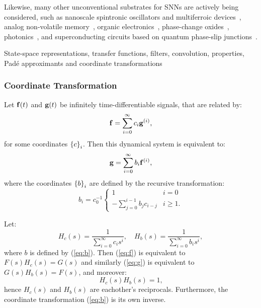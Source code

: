 Likewise, many other unconventional substrates for SNNs are actively being considered, such as nanoscale spintronic oscillators and multiferroic devices~\citep{torrejon2017neuromorphic, hoppensteadt2017applied, manipatruni2018beyond}, analog non-volatile memory~\citep{ambrogio2018equivalent}, organic electronics~\citep{van2018organic}, phase-change oxides~\citep{zhao2019low}, photonics~\citep{tait2018silicon, shainline2018largest}, and superconducting circuits based on quantum phase-slip junctions~\citep[QPSJs;][]{cheng2019superconducting}.


State-space representations, transfer functions, filters, convolution, properties, Pad\'e approximants and coordinate transformations

\subsubsection{Coordinate Transformation}

\begin{theorem}
Let $\mathbf{f}(t)$ and $\mathbf{g}(t)$ be infinitely time-differentiable signals, that are related by:
\begin{equation} \label{eq:f}
\mathbf{f} = \sum_{i=0}^\infty c_i \mathbf{g}^{(i)} \text{,}
\end{equation}
for some coordinates $\left\{ c \right\}_{i}$. Then this dynamical system is equivalent to:
\begin{equation} \label{eq:g}
\mathbf{g} = \sum_{i=0}^\infty b_i \mathbf{f}^{(i)} \text{,}
\end{equation}
where the coordinates $\left\{ b \right\}_{i}$ are defined by the recursive transformation:
\begin{equation} \label{eq:b}
b_i = c_0^{-1} \begin{cases}
    1 & i = 0 \\
    - \sum_{j=0}^{i-1} b_j c_{i - j} & i \ge 1 \text{.}
  \end{cases}
\end{equation}
\end{theorem}

\begin{corollary}
Let: $$H_c(s) = \frac{1}{\sum_{i=0}^\infty c_i s^i}, \quad H_b(s) = \frac{1}{\sum_{i=0}^\infty b_i s^i}, $$ where $b$ is defined by (\ref{eq:b}). Then (\ref{eq:f}) is equivalent to $F(s)H_c(s) = G(s)$ and similarly (\ref{eq:g}) is equivalent to $G(s)H_b(s) = F(s)$, and moreover:
\begin{equation} \label{eq:inv}
H_c(s) H_b(s) = 1 \text{,}
\end{equation}
hence $H_c(s)$ and $H_b(s)$ are eachother's reciprocals. Furthermore, the coordinate transformation (\ref{eq:b}) is its own inverse.
\end{corollary}

